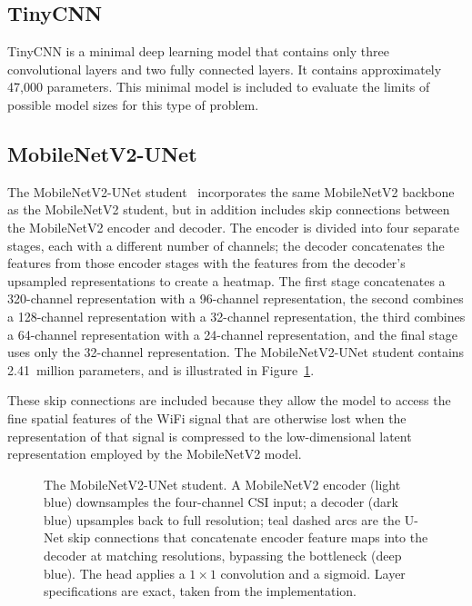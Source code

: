 \subsection{TinyCNN}
\label{sec:method:tinycnn}

TinyCNN is a minimal deep learning model that contains only three convolutional layers and two fully
connected layers. It contains approximately 47{,}000 parameters. This minimal model is included to
evaluate the limits of possible model sizes for this type of problem.

\subsection{MobileNetV2-UNet}
\label{sec:method:unet}

The MobileNetV2-UNet student~\cite{ronneberger2015unet} incorporates the same MobileNetV2 backbone as the
MobileNetV2 student, but in addition includes skip connections between the MobileNetV2 encoder and
decoder. The encoder is divided into four separate stages, each with a different number of channels; the
decoder concatenates the features from those encoder stages with the features from the decoder's
upsampled representations to create a heatmap. The first stage concatenates a 320-channel representation
with a 96-channel representation, the second combines a 128-channel representation with a 32-channel
representation, the third combines a 64-channel representation with a 24-channel representation, and the
final stage uses only the 32-channel representation. The MobileNetV2-UNet student contains 2.41~million
parameters, and is illustrated in Figure~\ref{fig:method:unet_arch}.

These skip connections are included because they allow the model to access the fine spatial features of
the WiFi signal that are otherwise lost when the representation of that signal is compressed to the
low-dimensional latent representation employed by the MobileNetV2 model.

\begin{figure}[H]
\centering
\resizebox{\linewidth}{!}{}
\caption{The MobileNetV2-UNet student. A MobileNetV2 encoder (light blue) downsamples the four-channel
CSI input; a decoder (dark blue) upsamples back to full resolution; teal dashed arcs are the U-Net skip
connections that concatenate encoder feature maps into the decoder at matching resolutions, bypassing the
bottleneck (deep blue). The head applies a $1{\times}1$ convolution and a sigmoid. Layer specifications
are exact, taken from the implementation.}
\label{fig:method:unet_arch}
\end{figure}

